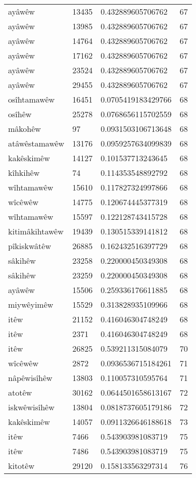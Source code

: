 \begin{longtable}{llll}
ayâwêw & 13435 & 0.432889605706762 & 67\\
ayâwêw & 13985 & 0.432889605706762 & 67\\
ayâwêw & 14764 & 0.432889605706762 & 67\\
ayâwêw & 17162 & 0.432889605706762 & 67\\
ayâwêw & 23524 & 0.432889605706762 & 67\\
ayâwêw & 29455 & 0.432889605706762 & 67\\
osîhtamawêw & 16451 & 0.0705419183429766 & 68\\
osîhêw & 25278 & 0.0768656115702559 & 68\\
mâkohêw & 97 & 0.0931503106713648 & 68\\
atâwêstamawêw & 13176 & 0.0959257634099839 & 68\\
kakêskimêw & 14127 & 0.101537713243645 & 68\\
kîhkihêw & 74 & 0.114353548892792 & 68\\
wîhtamawêw & 15610 & 0.117827324997866 & 68\\
wîcêwêw & 14775 & 0.120674445377319 & 68\\
wîhtamawêw & 15597 & 0.122128743415728 & 68\\
kitimâkihtawêw & 19439 & 0.130515339141812 & 68\\
pîkiskwâtêw & 26885 & 0.162432516397729 & 68\\
sâkihêw & 23258 & 0.220000450349308 & 68\\
sâkihêw & 23259 & 0.220000450349308 & 68\\
ayâwêw & 15506 & 0.259336176611885 & 68\\
miywêyimêw & 15529 & 0.313828935109966 & 68\\
itêw & 21152 & 0.416046304748249 & 68\\
itêw & 2371 & 0.416046304748249 & 68\\
itêw & 26825 & 0.539211315084079 & 70\\
wîcêwêw & 2872 & 0.0936536715184261 & 71\\
nâpêwisîhêw & 13803 & 0.110057310595764 & 71\\
atotêw & 30162 & 0.0644501658613167 & 72\\
iskwêwisîhêw & 13804 & 0.0818737605179186 & 72\\
kakêskimêw & 14057 & 0.0911326646188618 & 73\\
itêw & 7466 & 0.543903981083719 & 75\\
itêw & 7486 & 0.543903981083719 & 75\\
kitotêw & 29120 & 0.158133563297314 & 76\\

\end{longtable}
